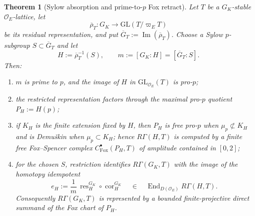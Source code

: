 \documentclass[11pt]{article}
\newtheorem{theorem}{Theorem}[section]
\theoremstyle{definition}
\begin{document}
\begin{theorem}[Sylow absorption and prime-to-$p$ Fox retract]\label{thm:sylow-fox-retract}
Let $T$ be a $G_K$-stable $\mathcal O_E$-lattice, let
\[
\overline\rho_T:G_K\longrightarrow \mathrm{GL}(T/\varpi_ET)
\]
be its residual representation, and put $\overline G_T:=\operatorname{Im}(\overline\rho_T)$.  Choose a Sylow $p$-subgroup $S\subset\overline G_T$ and let
\[
H:=\overline\rho_T^{-1}(S),
\qquad
m:=[G_K:H]=[\overline G_T:S].
\]
Then:
\begin{enumerate}[label=\textnormal{(\roman*)}]
\item $m$ is prime to $p$, and the image of $H$ in $\mathrm{GL}_{\mathcal O_E}(T)$ is pro-$p$;
\item the restricted representation factors through the maximal pro-$p$ quotient $P_H:=H(p)$;
\item if $K_H$ is the finite extension fixed by $H$, then $P_H$ is free pro-$p$ when $\mu_p\not\subset K_H$ and is Demu\v{s}kin when $\mu_p\subset K_H$; hence $R\Gamma(H,T)$ is computed by a finite free Fox--Spencer complex $C^\bullet_{\mathrm{Fox}}(P_H,T)$ of amplitude contained in $[0,2]$;
\item for the chosen $S$, restriction identifies $R\Gamma(G_K,T)$ with the image of the homotopy idempotent
\begin{equation}\label{eq:sylow-transfer-idempotent}
 e_H
 :=
 \frac1m\,\operatorname{res}_{H}^{G_K}
 \circ
 \operatorname{cor}_{H}^{G_K}
 \quad\in\quad
 \operatorname{End}_{D(\mathcal O_E)}R\Gamma(H,T).
\end{equation}
Consequently $R\Gamma(G_K,T)$ is represented by a bounded finite-projective direct summand of the Fox chart of $P_H$.
\end{enumerate}
\end{theorem}
\end{document}
